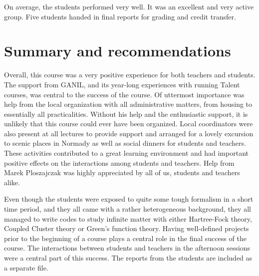\documentclass[prc,amsart,english]{revtex4}
\begin{document}
On average, the students performed very well. It was an excellent  and very active group. 
Five students handed in final reports for grading and credit transfer. 
\section{Summary and recommendations}


Overall, this course was a very positive experience for both teachers and students. 
The support from GANIL, and its year-long experiences with running Talent courses,
was central to the success of the course. Of uttermost importance was help from
the local organization with all administrative matters, from housing to essentially all  practicalities.
Without his help and the enthusiastic support, it is unlikely that this
course could ever have been organized. Local coordinators were also present at all lectures to
provide support and arranged for a lovely excursion to scenic places in Normady as well as social
dinners for students and teachers.  These activities contributed to a great learning environment
and had important positive effects on the interactions among students and teachers.
Help from Marek Ploszajczak was highly appreciated by all of us, students and teachers alike. 


Even though the students were exposed to quite some tough formalism in a short time period, and they all came with a rather heterogeneous background, they all managed to write codes to study infinite matter with either Hartree-Fock theory, Coupled Cluster theory or Green's function theory. Having well-defined projects prior to the beginning of a course plays a central role in the final success of the course. The interactions between students and teachers in the afternoon sessions
were a central part of this success. 
The reports
from the students are included as a separate file. 
\end{document}
